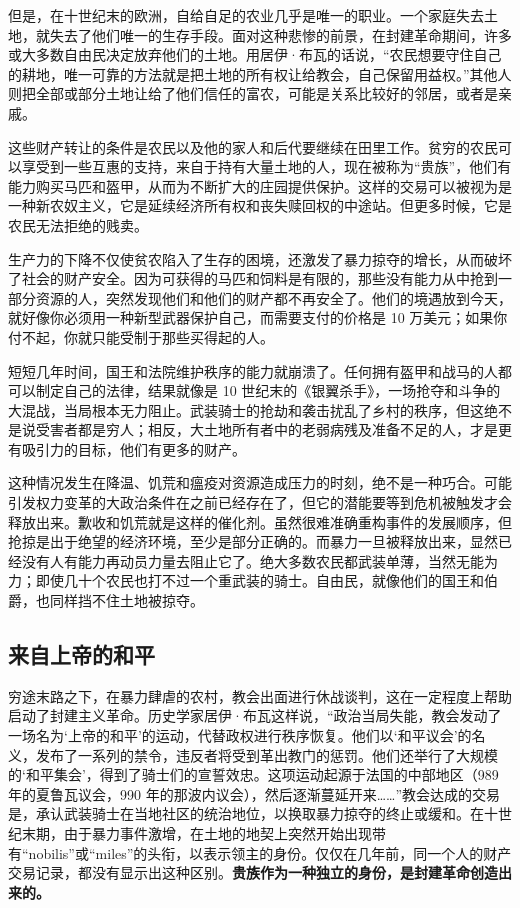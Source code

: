 但是，在十世纪末的欧洲，自给自足的农业几乎是唯一的职业。一个家庭失去土地，就失去了他们唯一的生存手段。面对这种悲惨的前景，在封建革命期间，许多或大多数自由民决定放弃他们的土地。用居伊·布瓦的话说，“农民想要守住自己的耕地，唯一可靠的方法就是把土地的所有权让给教会，自己保留用益权。”其他人则把全部或部分土地让给了他们信任的富农，可能是关系比较好的邻居，或者是亲戚。


这些财产转让的条件是农民以及他的家人和后代要继续在田里工作。贫穷的农民可以享受到一些互惠的支持，来自于持有大量土地的人，现在被称为“贵族”，他们有能力购买马匹和盔甲，从而为不断扩大的庄园提供保护。这样的交易可以被视为是一种新农奴主义，它是延续经济所有权和丧失赎回权的中途站。但更多时候，它是农民无法拒绝的贱卖。

生产力的下降不仅使贫农陷入了生存的困境，还激发了暴力掠夺的增长，从而破坏了社会的财产安全。因为可获得的马匹和饲料是有限的，那些没有能力从中抢到一部分资源的人，突然发现他们和他们的财产都不再安全了。他们的境遇放到今天，就好像你必须用一种新型武器保护自己，而需要支付的价格是 10 万美元；如果你付不起，你就只能受制于那些买得起的人。

短短几年时间，国王和法院维护秩序的能力就崩溃了。任何拥有盔甲和战马的人都可以制定自己的法律，结果就像是 10 世纪末的《银翼杀手》，一场抢夺和斗争的大混战，当局根本无力阻止。武装骑士的抢劫和袭击扰乱了乡村的秩序，但这绝不是说受害者都是穷人；相反，大土地所有者中的老弱病残及准备不足的人，才是更有吸引力的目标，他们有更多的财产。

这种情况发生在降温、饥荒和瘟疫对资源造成压力的时刻，绝不是一种巧合。可能引发权力变革的大政治条件在之前已经存在了，但它的潜能要等到危机被触发才会释放出来。歉收和饥荒就是这样的催化剂。虽然很难准确重构事件的发展顺序，但抢掠是出于绝望的经济环境，至少是部分正确的。而暴力一旦被释放出来，显然已经没有人有能力再动员力量去阻止它了。绝大多数农民都武装单薄，当然无能为力；即使几十个农民也打不过一个重武装的骑士。自由民，就像他们的国王和伯爵，也同样挡不住土地被掠夺。

\subsection{来自上帝的和平}
穷途末路之下，在暴力肆虐的农村，教会出面进行休战谈判，这在一定程度上帮助启动了封建主义革命。历史学家居伊·布瓦这样说，“政治当局失能，教会发动了一场名为‘上帝的和平’的运动，代替政权进行秩序恢复。他们以‘和平议会’的名义，发布了一系列的禁令，违反者将受到革出教门的惩罚。他们还举行了大规模的‘和平集会’，得到了骑士们的宣誓效忠。这项运动起源于法国的中部地区（989 年的夏鲁瓦议会，990 年的那波内议会），然后逐渐蔓延开来……”教会达成的交易是，承认武装骑士在当地社区的统治地位，以换取暴力掠夺的终止或缓和。在十世纪末期，由于暴力事件激增，在土地的地契上突然开始出现带有“nobilis”或“miles”的头衔，以表示领主的身份。仅仅在几年前，同一个人的财产交易记录，都没有显示出这种区别。\textbf{贵族作为一种独立的身份，是封建革命创造出来的。}

